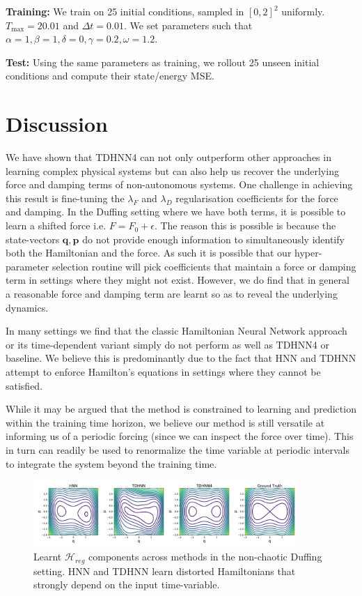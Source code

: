 \documentclass[twoside]{article}
\begin{document}
\textbf{Training:} We train on 25 initial conditions, sampled in $[0,2]^2$ uniformly. $T_{\max} = 20.01$ and $\Delta t = 0.01$. We set parameters such that $\alpha =1, \beta =1,\delta =0,\gamma = 0.2,\omega = 1.2$.

\textbf{Test:} Using the same parameters as training, we rollout 25 unseen initial conditions and compute their state/energy MSE.

\section{Discussion}

We have shown that TDHNN4 can not only outperform other approaches in learning complex physical systems but can also help us recover the underlying force and damping terms of non-autonomous systems. One challenge in achieving this result is fine-tuning the $\lambda_F$ and $\lambda_D$ regularisation coefficients for the force and damping. In the Duffing setting where we have both terms, it is possible to learn a shifted force i.e. $F = F_0 + \epsilon$. The reason this is possible is because the state-vectors $\mathbf{q},\mathbf{p}$ do not provide enough information to simultaneously identify both the Hamiltonian and the force. As such it is possible that our hyper-parameter selection routine will pick coefficients that maintain a force or damping term in settings where they might not exist. However, we do find that in general a reasonable force and damping term are learnt so as to reveal the underlying dynamics.


In many settings we find that the classic Hamiltonian Neural Network approach or its time-dependent variant simply do not perform as well as TDHNN4 or baseline. We believe this is predominantly due to the fact that HNN and TDHNN attempt to enforce Hamilton's equations in settings where they cannot be satisfied.

While it may be argued that the method is constrained to learning and prediction within the training time horizon, we believe our method is still versatile at informing us of a periodic forcing (since we can inspect the force over time). This in turn can readily be used to renormalize the time variable at periodic intervals to integrate the system beyond the training time.
\begin{figure}[h]
\centering
\includegraphics[width=0.9\textwidth]{figures/duffing_ham_1.pdf}
\caption{Learnt $\mathcal{H}_{reg}$ components across methods in the non-chaotic Duffing setting. HNN and TDHNN learn distorted Hamiltonians that strongly depend on the input time-variable.}
\label{duffing_ham}
\end{figure}
\end{document}
